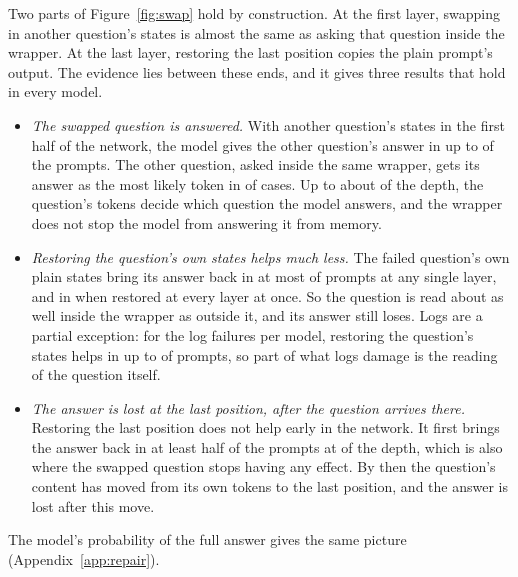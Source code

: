 Two parts of Figure~\ref{fig:swap} hold by construction. At the first layer, swapping in another question's states is almost the same as asking that question inside the wrapper. At the last layer, restoring the last position copies the plain prompt's output. The evidence lies between these ends, and it gives three results that hold in every model.
\begin{itemize}
\item \emph{The swapped question is answered.} With another question's states in the first half of the network, the model gives the other question's answer in up to \SwapPeak{} of the prompts. The other question, asked inside the same wrapper, gets its answer as the most likely token in \DonorTopOne{} of cases. Up to about \HandoffDepth{} of the depth, the question's tokens decide which question the model answers, and the wrapper does not stop the model from answering it from memory.
\item \emph{Restoring the question's own states helps much less.} The failed question's own plain states bring its answer back in at most \RestorePeak{} of prompts at any single layer, and in \RestoreAll{} when restored at every layer at once. So the question is read about as well inside the wrapper as outside it, and its answer still loses. Logs are a partial exception: for the \NLogPairs{} log failures per model, restoring the question's states helps in up to \RestorePeakLog{} of prompts, so part of what logs damage is the reading of the question itself.
\item \emph{The answer is lost at the last position, after the question arrives there.} Restoring the last position does not help early in the network. It first brings the answer back in at least half of the prompts at \HandoffDepth{} of the depth, which is also where the swapped question stops having any effect. By then the question's content has moved from its own tokens to the last position, and the answer is lost after this move.
\end{itemize}
The model's probability of the full answer gives the same picture (Appendix~\ref{app:repair}).
